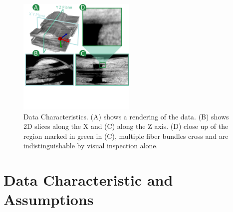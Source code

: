 
\begin{figure}[tb]
\centering
\includegraphics[width=0.5\textwidth, trim = 0mm 110mm 0mm 0mm, clip,]{images_pvis/figure1}
\caption{Data Characteristics. (A) shows a rendering of the data. (B) shows 2D slices along the X and (C) along the Z axis. (D) close up of the region marked in green in (C), multiple fiber bundles cross and are indistinguishable by visual inspection alone. }
\label{fig:data-char}
\end{figure}
\section {Data Characteristic and Assumptions}
\label{sec:char_data}

